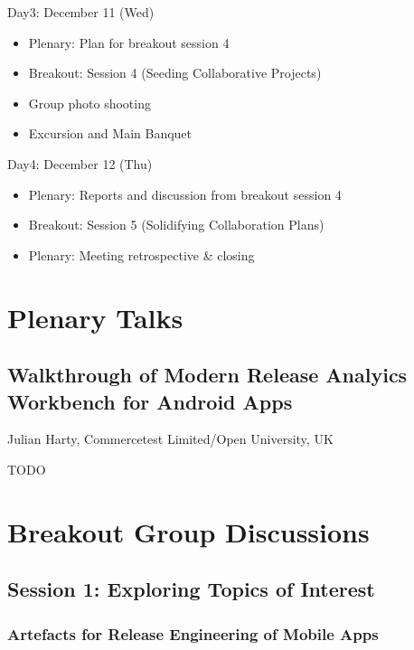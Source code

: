 \documentclass[a4paper]{article}
\begin{document}
\begin{bfseries}
Day3: December 11 (Wed)
\end{bfseries}
\begin{itemize}
\item Plenary: Plan for breakout session 4
\item Breakout: Session 4 (Seeding Collaborative Projects)
\item Group photo shooting
\item Excursion and Main Banquet
\end{itemize}
\begin{bfseries}
Day4: December 12 (Thu)
\end{bfseries}
\begin{itemize}
\item Plenary: Reports and discussion from breakout session 4
\item Breakout: Session 5 (Solidifying Collaboration Plans)
\item Plenary: Meeting retrospective \& closing
\end{itemize}

\clearpage

\section{Plenary Talks}

\subsection{Walkthrough of Modern Release Analyics Workbench for Android Apps}

Julian Harty, Commercetest Limited/Open University, UK

TODO

\clearpage

\section{Breakout Group Discussions}

\subsection{Session 1: Exploring Topics of Interest}

\subsubsection{Artefacts for Release Engineering of Mobile Apps}
\end{document}
